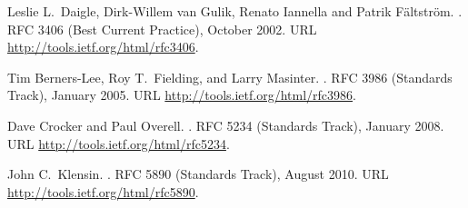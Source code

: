 \documentclass[12pt]{article}  %
\begin{document}
\begin{thebibliography}{2}



Leslie L.\ Daigle, Dirk-Willem van Gulik, Renato Iannella and Patrik Fältström.
.
\newblock RFC 3406 (Best Current Practice), October 2002.
\newblock URL \url{http://tools.ietf.org/html/rfc3406}.

Tim Berners-Lee, Roy T.\ Fielding, and Larry Masinter.
.
\newblock RFC 3986 (Standards Track), January 2005.
\newblock URL \url{http://tools.ietf.org/html/rfc3986}.



Dave Crocker and Paul Overell.
.
\newblock RFC 5234 (Standards Track), January 2008.
\newblock URL \url{http://tools.ietf.org/html/rfc5234}.

John C.\ Klensin.
.
\newblock RFC 5890 (Standards Track), August 2010.
\newblock URL \url{http://tools.ietf.org/html/rfc5890}.



\end{thebibliography}
\end{document}
